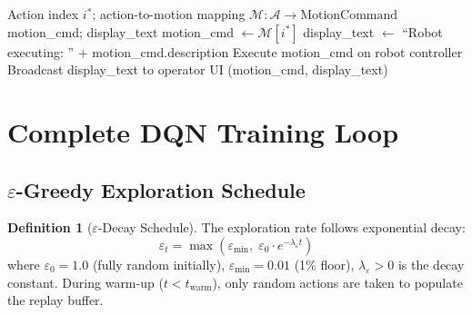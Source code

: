 \documentclass[12pt,a4paper]{article}
\theoremstyle{definition}
\newtheorem{definition}{Definition}[section]
\theoremstyle{plain}
\theoremstyle{remark}
\begin{document}
\begin{algorithm}[H]
\caption{Motion Translation and Operator Feedback}
\label{alg:motion_translate}
\begin{algorithmic}[1]
\Require Action index $i^*$; action-to-motion mapping $\mathcal{M}: \mathcal{A} \to \text{MotionCommand}$
\Ensure motion\_cmd; display\_text
\State motion\_cmd $\gets \mathcal{M}[i^*]$ 
\State display\_text $\gets$ ``Robot executing: '' + motion\_cmd.description
\State Execute motion\_cmd on robot controller
\State Broadcast display\_text to operator UI 
\State \Return (motion\_cmd, display\_text)
\end{algorithmic}
\end{algorithm}

\newpage
\section{Complete DQN Training Loop}
\label{sec:dqn_training}

\subsection{$\varepsilon$-Greedy Exploration Schedule}

\begin{definition}[$\varepsilon$-Decay Schedule]
The exploration rate follows exponential decay:
\[
  \varepsilon_t = \max\!\left(\varepsilon_{\min},\; \varepsilon_0 \cdot e^{-\lambda_\varepsilon t}\right)
\]
where $\varepsilon_0 = 1.0$ (fully random initially), $\varepsilon_{\min} = 0.01$ (1\% floor), $\lambda_\varepsilon > 0$ is the decay constant. During warm-up ($t < t_{\text{warm}}$), only random actions are taken to populate the replay buffer.
\end{definition}
\end{document}
